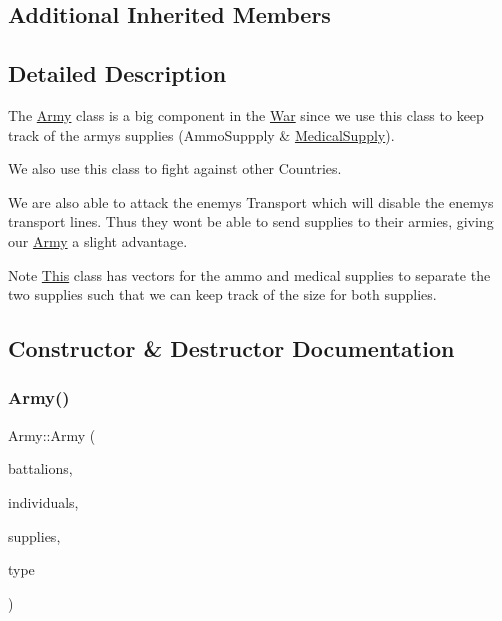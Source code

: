 \subsection*{Additional Inherited Members}


\subsection{Detailed Description}
The \mbox{\hyperlink{class_army}{Army}} class is a big component in the \mbox{\hyperlink{class_war}{War}} since we use this class to keep track of the army\textquotesingle{}s supplies (Ammo\+Suppply \& \mbox{\hyperlink{class_medical_supply}{Medical\+Supply}}).
\begin{DoxyItemize}
\item We also use this class to fight against other Countries.
\item We are also able to attack the enemy\textquotesingle{}s Transport which will disable the enemy\textquotesingle{}s transport lines. Thus they won\textquotesingle{}t be able to send supplies to their armies, giving our \mbox{\hyperlink{class_army}{Army}} a slight advantage. \begin{DoxyNote}{Note}
\mbox{\hyperlink{class_this}{This}} class has vectors for the ammo and medical supplies to separate the two supplies such that we can keep track of the size for both supplies. 
\end{DoxyNote}

\end{DoxyItemize}

\subsection{Constructor \& Destructor Documentation}
\mbox{\label{class_army_a24aef716a43cb562ed74dcad7ee0163b}} 
\subsubsection{\texorpdfstring{Army()}{Army()}}
{\footnotesize\ttfamily Army\+::\+Army (\begin{DoxyParamCaption}\item[{std\+::vector$<$ \mbox{\hyperlink{class_army_component}{Army\+Component}} $\ast$ $>$ $\ast$}]{battalions,  }\item[{std\+::vector$<$ \mbox{\hyperlink{class_army_component}{Army\+Component}} $\ast$ $>$ $\ast$}]{individuals,  }\item[{std\+::vector$<$ \mbox{\hyperlink{class_supply}{Supply}} $\ast$ $>$ $\ast$}]{supplies,  }\item[{std\+::string}]{type }\end{DoxyParamCaption})}




